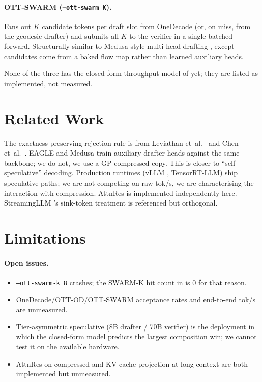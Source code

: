 \documentclass[11pt]{article}
\begin{document}
\paragraph{OTT-SWARM (\texttt{--ott-swarm K}).}  Fans out $K$ candidate
tokens per draft slot from OneDecode (or, on miss, from the geodesic
drafter) and submits all $K$ to the verifier in a single batched forward.
Structurally similar to Medusa-style multi-head drafting
\cite{cai2024medusa}, except candidates come from a baked flow map
rather than learned auxiliary heads.

\noindent
None of the three has the closed-form throughput model of
 yet; they are listed as
implemented, not measured.

\section{Related Work}
The exactness-preserving rejection rule is from Leviathan et~al.\
\cite{leviathan2023speculative} and Chen et~al.\ \cite{chen2023speculative}.
EAGLE \cite{li2024eagle} and Medusa \cite{cai2024medusa} train auxiliary
drafter heads against the same backbone; we do not, we use a
GP-compressed copy.  This is closer to ``self-speculative''
decoding.  Production runtimes (vLLM \cite{kwon2023vllm}, TensorRT-LLM)
ship speculative paths; we are not competing on raw tok/s, we are
characterising the interaction with compression.  AttnRes is implemented
independently here.  StreamingLLM \cite{xiao2023streamingllm}'s sink-token
treatment is referenced but orthogonal.

\section{Limitations}
\label{sec:status}
\paragraph{Open issues.}
\begin{itemize}
\item \texttt{--ott-swarm-k 8} crashes; the SWARM-K hit count in
\Cref{tab:measured} is $0$ for that reason.
\item OneDecode/OTT-OD/OTT-SWARM acceptance rates and end-to-end tok/s
are unmeasured.
\item Tier-asymmetric speculative (8B drafter / 70B verifier) is the
deployment in which the closed-form model predicts the largest
composition win; we cannot test it on the available hardware.
\item AttnRes-on-compressed and KV-cache-projection at long context are
both implemented but unmeasured.
\end{itemize}
\end{document}
